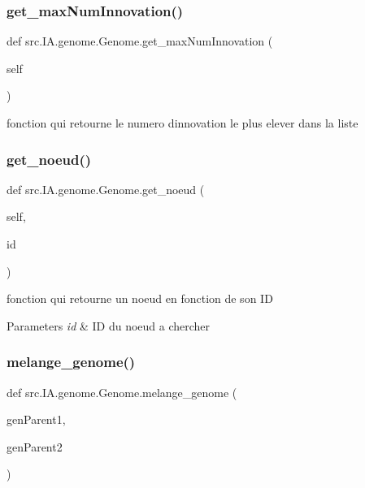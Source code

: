 \subsubsection{\texorpdfstring{get\+\_\+max\+Num\+Innovation()}{get\_maxNumInnovation()}}
{\footnotesize\ttfamily def src.\+I\+A.\+genome.\+Genome.\+get\+\_\+max\+Num\+Innovation (\begin{DoxyParamCaption}\item[{}]{self }\end{DoxyParamCaption})}



fonction qui retourne le numero d\textquotesingle{}innovation le plus elever dans la liste 

\mbox{\label{classsrc_1_1_i_a_1_1genome_1_1_genome_a3ae6b59375d7cb648e6e65b299745136}} 
\subsubsection{\texorpdfstring{get\+\_\+noeud()}{get\_noeud()}}
{\footnotesize\ttfamily def src.\+I\+A.\+genome.\+Genome.\+get\+\_\+noeud (\begin{DoxyParamCaption}\item[{}]{self,  }\item[{}]{id }\end{DoxyParamCaption})}



fonction qui retourne un noeud en fonction de son ID 


\begin{DoxyParams}{Parameters}
{\em id} & ID du noeud a chercher \\
\hline
\end{DoxyParams}
\mbox{\label{classsrc_1_1_i_a_1_1genome_1_1_genome_aa0ad761608127d6f8cdb4287149643fd}} 
\subsubsection{\texorpdfstring{melange\+\_\+genome()}{melange\_genome()}}
{\footnotesize\ttfamily def src.\+I\+A.\+genome.\+Genome.\+melange\+\_\+genome (\begin{DoxyParamCaption}\item[{}]{gen\+Parent1,  }\item[{}]{gen\+Parent2 }\end{DoxyParamCaption})\hspace{0.3cm}{\ttfamily [static]}}




